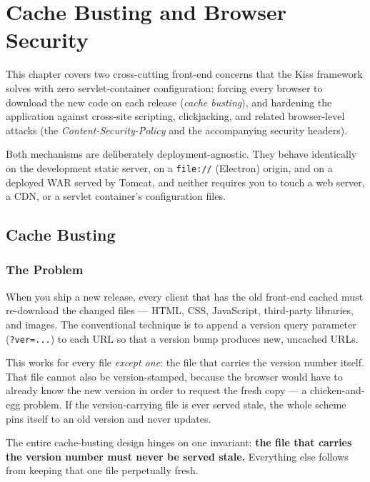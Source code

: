 \chapter{Cache Busting and Browser Security}
\label{ch:caching-security}

This chapter covers two cross-cutting front-end concerns that the Kiss framework solves with zero servlet-container configuration: forcing every browser to download the new code on each release (\emph{cache busting}), and hardening the application against cross-site scripting, clickjacking, and related browser-level attacks (the \emph{Content-Security-Policy} and the accompanying security headers).

Both mechanisms are deliberately deployment-agnostic.  They behave identically on the development static server, on a \texttt{file://} (Electron) origin, and on a deployed WAR served by Tomcat, and neither requires you to touch a web server, a CDN, or a servlet container's configuration files.

\section{Cache Busting}
\label{sec:cache-busting}

\subsection{The Problem}
\label{sec:cache-the-problem}

When you ship a new release, every client that has the old front-end cached must re-download the changed files --- HTML, CSS, JavaScript, third-party libraries, and images.  The conventional technique is to append a version query parameter (\texttt{?ver=...}) to each URL so that a version bump produces new, uncached URLs.

This works for every file \emph{except one}: the file that carries the version number itself.  That file cannot also be version-stamped, because the browser would have to already know the new version in order to request the fresh copy --- a chicken-and-egg problem.  If the version-carrying file is ever served stale, the whole scheme pins itself to an old version and never updates.

\begin{notebox}
The entire cache-busting design hinges on one invariant: \textbf{the file that carries the version number must never be served stale.}  Everything else follows from keeping that one file perpetually fresh.
\end{notebox}


